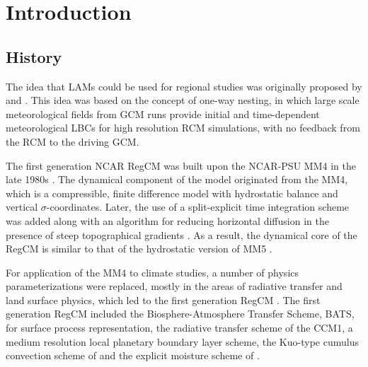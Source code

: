 
\section{Introduction}

\subsection{History} The idea that \ac{LAMs} could be used for regional studies
was originally proposed by \citet{Dickinson_89} and \citet{Giorgi_90}. This idea
was based on the concept of one-way nesting, in which large scale meteorological
fields from \ac{GCM} runs provide initial and time-dependent meteorological
\ac{LBCs} for high resolution \ac{RCM} simulations, with no feedback from the
\ac{RCM} to the driving \ac{GCM}.

The first generation NCAR \ac{RegCM} was built upon the \ac{NCAR}-\ac{PSU}
\ac{MM4} in the late 1980s \citep{Dickinson_89,Giorgi_89}. The dynamical
component of the model originated from the \ac{MM4}, which is a compressible,
finite difference model with hydrostatic balance and vertical
$\sigma$-coordinates. Later, the use of a split-explicit time integration scheme
was added along with an algorithm for reducing horizontal diffusion in the
presence of steep topographical gradients \citep{Giorgi_93,Giorgi_93b}.  As a
result, the dynamical core of the \ac{RegCM} is similar to that of the
hydrostatic version of \ac{MM5} \citep{Grell_94}.

For application of the \ac{MM4} to climate studies, a number of physics
parameterizations were replaced, mostly in the areas of radiative transfer and
land surface physics, which led to the first generation \ac{RegCM}
\citep{Dickinson_89,Giorgi_90}. The first generation \ac{RegCM} included the
Biosphere-Atmosphere Transfer Scheme, BATS, \citep{Dickinson_86} for surface
process representation, the radiative transfer scheme of the \ac{CCM1}, a medium
resolution local planetary boundary layer scheme, the Kuo-type cumulus
convection scheme of \citep{Anthes_77} and the explicit moisture scheme of
\citep{Hsie_84}.

